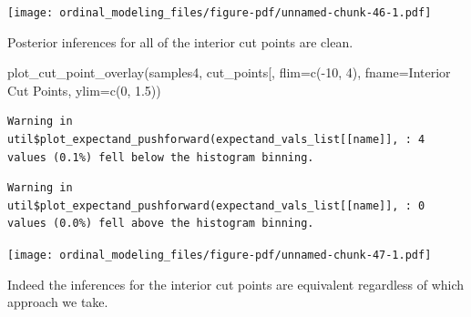 \documentclass[
  letterpaper,
  DIV=11,
  numbers=noendperiod]{scrartcl}
\newenvironment{Shaded}{\begin{snugshade}}{\end{snugshade}}
\newcommand{\AttributeTok}[1]{\textcolor[rgb]{0.40,0.45,0.13}{#1}}
\newcommand{\DecValTok}[1]{\textcolor[rgb]{0.68,0.00,0.00}{#1}}
\newcommand{\FloatTok}[1]{\textcolor[rgb]{0.68,0.00,0.00}{#1}}
\newcommand{\FunctionTok}[1]{\textcolor[rgb]{0.28,0.35,0.67}{#1}}
\newcommand{\NormalTok}[1]{\textcolor[rgb]{0.00,0.23,0.31}{#1}}
\newcommand{\SpecialCharTok}[1]{\textcolor[rgb]{0.37,0.37,0.37}{#1}}
\newcommand{\StringTok}[1]{\textcolor[rgb]{0.13,0.47,0.30}{#1}}
\begin{document}
\texttt{[image: ordinal\_modeling\_files/figure-pdf/unnamed-chunk-46-1.pdf]}

Posterior inferences for all of the interior cut points are clean.

\begin{Shaded}
\begin{Highlighting}[]
\FunctionTok{plot\_cut\_point\_overlay}\NormalTok{(samples4, }\StringTok{\textquotesingle{}cut\_points[\textquotesingle{}}\NormalTok{,}
                       \AttributeTok{flim=}\FunctionTok{c}\NormalTok{(}\SpecialCharTok{{-}}\DecValTok{10}\NormalTok{, }\DecValTok{4}\NormalTok{), }\AttributeTok{fname=}\StringTok{\textquotesingle{}Interior Cut Points\textquotesingle{}}\NormalTok{,}
                       \AttributeTok{ylim=}\FunctionTok{c}\NormalTok{(}\DecValTok{0}\NormalTok{, }\FloatTok{1.5}\NormalTok{))}
\end{Highlighting}
\end{Shaded}

\begin{verbatim}
Warning in util$plot_expectand_pushforward(expectand_vals_list[[name]], : 4
values (0.1%) fell below the histogram binning.
\end{verbatim}

\begin{verbatim}
Warning in util$plot_expectand_pushforward(expectand_vals_list[[name]], : 0
values (0.0%) fell above the histogram binning.
\end{verbatim}

\texttt{[image: ordinal\_modeling\_files/figure-pdf/unnamed-chunk-47-1.pdf]}

Indeed the inferences for the interior cut points are equivalent
regardless of which approach we take.
\end{document}
